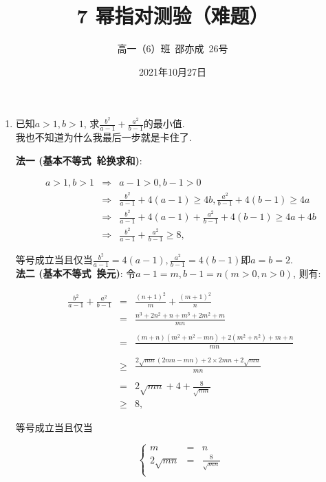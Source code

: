 \documentclass[8pt]{article}
\author{高一（6）班\ 邵亦成\ 26号}
\title{7 幂指对测验（难题）}
\date{2021年10月27日}
\begin{document}
	\maketitle

	\begin{enumerate}[label=(\arabic*)]
		\item 已知$a>1, b>1$, 求$\displaystyle \frac{b^2}{a-1} + \frac{a^2}{b-1}$的最小值.
			~\\

			我也不知道为什么我最后一步就是卡住了.

			\textbf{法一 (基本不等式\ 轮换求和)}: 

				$$
				\begin{array}{rcl}
				a>1, b>1&\Rightarrow&a-1>0, b-1>0\\
				&\Rightarrow&\displaystyle \frac{b^2}{a-1}+4(a-1)\geq 4b, \frac{a^2}{b-1}+4(b-1)\geq 4a\\
				&\Rightarrow&\displaystyle \frac{b^2}{a-1}+4(a-1) + \frac{a^2}{b-1}+4(b-1)\geq 4a + 4b\\
				&\Rightarrow&\displaystyle \frac{b^2}{a-1}+\frac{a^2}{b-1}\geq 8,
				\end{array}
				$$

				等号成立当且仅当$\displaystyle \frac{b^2}{a-1}=4(a-1), \frac{a^2}{b-1}=4(b-1)$即$a=b=2$.
			~\\

			\textbf{法二 (基本不等式\ 换元)}: 令$a-1=m, b-1=n (m>0, n>0)$, 则有: 

				$$
				\begin{array}{rcl}
					\displaystyle \frac{b^2}{a-1} + \frac{a^2}{b-1}&=&\displaystyle \frac{(n+1)^2}{m}+\frac{(m+1)^2}{n}\\
					&=&\displaystyle \frac{n^3+2n^2+n+m^3+2m^2+m}{mn}\\\\
					&=&\displaystyle \frac{(m+n)(m^2+n^2-mn)+2(m^2+n^2)+m+n}{mn}\\\\
					&\geq&\displaystyle \frac{2\sqrt{mn}(2mn-mn)+2\times 2mn+2\sqrt{mn}}{mn}\\\\
					&=&2\displaystyle \sqrt{mn}+4+\frac{8}{\sqrt{mn}}\\
					&\geq&8,
				\end{array}
				$$

				等号成立当且仅当

				$$
				\left\{
				\begin{array}{rcl}
					m&=&n\\
					2\sqrt{mn}&=&\displaystyle\frac{8}{\sqrt{mn}}\\
				\end{array}
				\right.
				$$


\end{enumerate}
\end{document}
